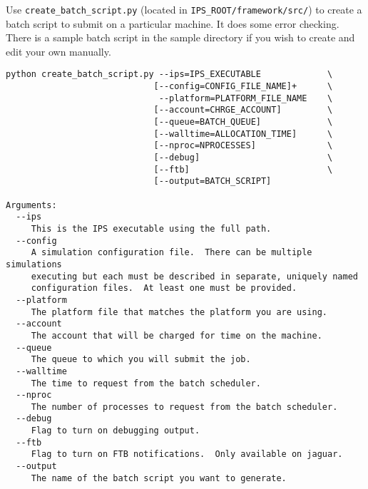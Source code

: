 \par
Use \texttt{create\_batch\_script.py} (located in \texttt{IPS\_ROOT/framework/src/}) to create a 
batch script to submit on a particular machine.  It does some error 
checking.  There is a sample batch script in the sample directory if you 
wish to create and edit your own manually.

\begin{verbatim}
python create_batch_script.py --ips=IPS_EXECUTABLE             \
                             [--config=CONFIG_FILE_NAME]+      \
                              --platform=PLATFORM_FILE_NAME    \
                             [--account=CHRGE_ACCOUNT]         \
                             [--queue=BATCH_QUEUE]             \
                             [--walltime=ALLOCATION_TIME]      \
                             [--nproc=NPROCESSES]              \
                             [--debug]                         \
                             [--ftb]                           \
                             [--output=BATCH_SCRIPT]           

Arguments:
  --ips
     This is the IPS executable using the full path.
  --config
     A simulation configuration file.  There can be multiple simulations 
     executing but each must be described in separate, uniquely named 
     configuration files.  At least one must be provided.
  --platform
     The platform file that matches the platform you are using.
  --account
     The account that will be charged for time on the machine.
  --queue
     The queue to which you will submit the job.
  --walltime
     The time to request from the batch scheduler.
  --nproc
     The number of processes to request from the batch scheduler.
  --debug
     Flag to turn on debugging output.
  --ftb
     Flag to turn on FTB notifications.  Only available on jaguar.
  --output
     The name of the batch script you want to generate.
     
\end{verbatim}
